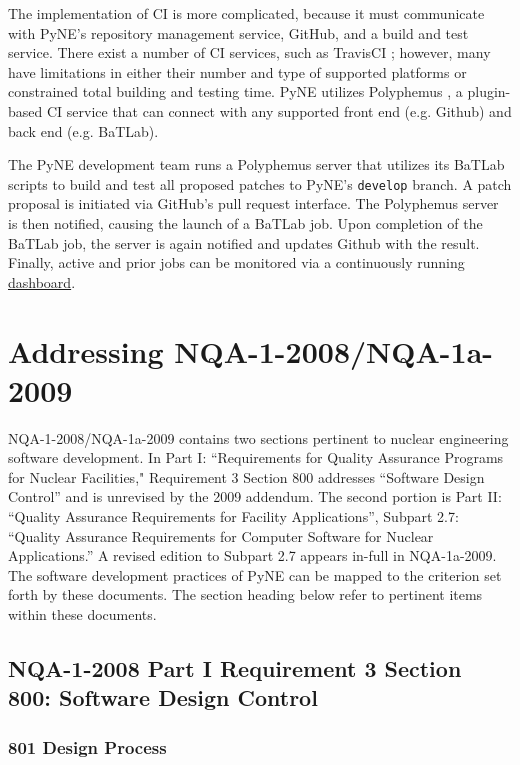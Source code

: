 \documentclass{anstrans}
\begin{document}
The implementation of CI is more complicated, because it
must communicate with PyNE's repository management service, GitHub, and a build
and test service. There exist a number of CI services, such as TravisCI
\cite{travis_2014}; however, many have limitations in either their number and
type of supported platforms or constrained total building and testing time. PyNE
utilizes Polyphemus \cite{polyphemus_2014}, a plugin-based CI service that can
connect with any supported front end (e.g. Github) and back end (e.g. BaTLab).

The PyNE development team runs a Polyphemus server that utilizes its BaTLab
scripts to build and test all proposed patches to PyNE's \texttt{develop}
branch. A patch proposal is initiated via GitHub's pull request
interface. The Polyphemus server is then notified, causing the launch of a
BaTLab job. Upon completion of the BaTLab job, the server is again notified and
updates Github with the result. Finally, active and prior jobs can be monitored
via a continuously running \href{http://gorgus.pyne.io/dashboard}{dashboard}.


\section{Addressing NQA-1-2008/NQA-1a-2009}

NQA-1-2008/NQA-1a-2009 contains two sections pertinent to nuclear engineering
software development. In Part I: ``Requirements for Quality Assurance Programs
for Nuclear Facilities," Requirement 3 Section 800 addresses ``Software Design
Control'' and is unrevised by the 2009 addendum. The second portion is Part II:
``Quality Assurance Requirements for Facility Applications'', Subpart 2.7:
``Quality Assurance Requirements for Computer Software for Nuclear
Applications.'' A revised edition to Subpart 2.7 appears in-full in NQA-1a-2009.
The software development practices of PyNE can be mapped to the criterion set
forth by these documents. The section heading below refer to pertinent items
within these documents.

\subsection{NQA-1-2008 Part I Requirement 3 Section 800: Software Design Control}

\subsubsection{801 Design Process}
\end{document}
